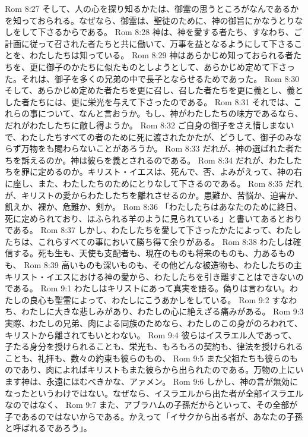 Rom 8:27  そして、人の心を探り知るかたは、御霊の思うところがなんであるかを知っておられる。なぜなら、御霊は、聖徒のために、神の御旨にかなうとりなしをして下さるからである。
Rom 8:28  神は、神を愛する者たち、すなわち、ご計画に従って召された者たちと共に働いて、万事を益となるようにして下さることを、わたしたちは知っている。
Rom 8:29  神はあらかじめ知っておられる者たちを、更に御子のかたちに似たものとしようとして、あらかじめ定めて下さった。それは、御子を多くの兄弟の中で長子とならせるためであった。
Rom 8:30  そして、あらかじめ定めた者たちを更に召し、召した者たちを更に義とし、義とした者たちには、更に栄光を与えて下さったのである。
Rom 8:31  それでは、これらの事について、なんと言おうか。もし、神がわたしたちの味方であるなら、だれがわたしたちに敵し得ようか。
Rom 8:32  ご自身の御子をさえ惜しまないで、わたしたちすべての者のために死に渡されたかたが、どうして、御子のみならず万物をも賜わらないことがあろうか。
Rom 8:33  だれが、神の選ばれた者たちを訴えるのか。神は彼らを義とされるのである。
Rom 8:34  だれが、わたしたちを罪に定めるのか。キリスト・イエスは、死んで、否、よみがえって、神の右に座し、また、わたしたちのためにとりなして下さるのである。
Rom 8:35  だれが、キリストの愛からわたしたちを離れさせるのか。患難か、苦悩か、迫害か、飢えか、裸か、危難か、剣か。
Rom 8:36  「わたしたちはあなたのために終日、死に定められており、ほふられる羊のように見られている」と書いてあるとおりである。
Rom 8:37  しかし、わたしたちを愛して下さったかたによって、わたしたちは、これらすべての事において勝ち得て余りがある。
Rom 8:38  わたしは確信する。死も生も、天使も支配者も、現在のものも将来のものも、力あるものも、
Rom 8:39  高いものも深いものも、その他どんな被造物も、わたしたちの主キリスト・イエスにおける神の愛から、わたしたちを引き離すことはできないのである。
Rom 9:1  わたしはキリストにあって真実を語る。偽りは言わない。わたしの良心も聖霊によって、わたしにこうあかしをしている。
Rom 9:2  すなわち、わたしに大きな悲しみがあり、わたしの心に絶えざる痛みがある。
Rom 9:3  実際、わたしの兄弟、肉による同族のためなら、わたしのこの身がのろわれて、キリストから離されてもいとわない。
Rom 9:4  彼らはイスラエル人であって、子たる身分を授けられることも、栄光も、もろもろの契約も、律法を授けられることも、礼拝も、数々の約束も彼らのもの、
Rom 9:5  また父祖たちも彼らのものであり、肉によればキリストもまた彼らから出られたのである。万物の上にいます神は、永遠にほむべきかな、アァメン。
Rom 9:6  しかし、神の言が無効になったというわけではない。なぜなら、イスラエルから出た者が全部イスラエルなのではなく、
Rom 9:7  また、アブラハムの子孫だからといって、その全部が子であるのではないからである。かえって「イサクから出る者が、あなたの子孫と呼ばれるであろう」。
